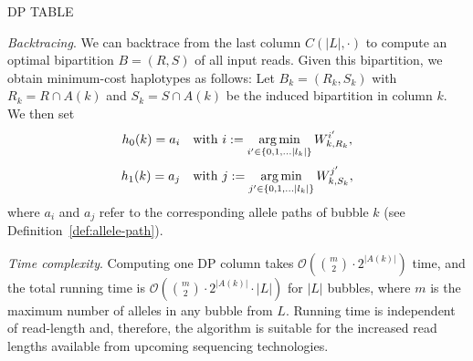 \begin{algorithm}
    \caption{\label{alg:dp-table}\textsc{DP TABLE}}
\end{algorithm}

\textit{Backtracing}. We can backtrace from the last column $C(|L|, \cdot)$ to compute an optimal bipartition $B=(R,S)$ of all input reads.
Given this bipartition, we obtain minimum-cost haplotypes as follows:
Let $B_k=(R_k,S_k)$ with $R_k=R\cap A(k)$ and $S_k=S\cap A(k)$ be the induced bipartition in column $k$.
We then set
\begin{equation}\label{eqn:haplo_c1}
h_0(k)= a_i \quad \text{with } i:=\operatorname*{arg\,min}_{i'\in \{0,1, \ldots |l_k|\}} W_{k,{R_k}}^{i'}, \nonumber
\end{equation}
\begin{equation}\label{eqn:haplo_c2}
h_1(k)= a_j \quad \text{with } j:=\operatorname*{arg\,min}_{j'\in \{0,1, \ldots |l_k|\}} W_{k,{S_k}}^{j'}, \nonumber
\end{equation}
where $a_i$ and $a_j$ refer to the corresponding allele paths of bubble $k$ (see Definition~\ref{def:allele-path}).

\textit{Time complexity}. 
Computing one DP column takes $\mathcal{O}( {m \choose 2} \cdot 2^{|A(k)|})$ time, and the total running time is $\mathcal{O}( {m \choose 2} \cdot 2^{|A(k)|} \cdot |L|)$ for $|L|$ bubbles, where $m$ is the maximum number of alleles in any bubble from $L$. 
Running time is independent of read-length and, therefore, the algorithm is suitable for the increased read lengths available from upcoming sequencing technologies.


